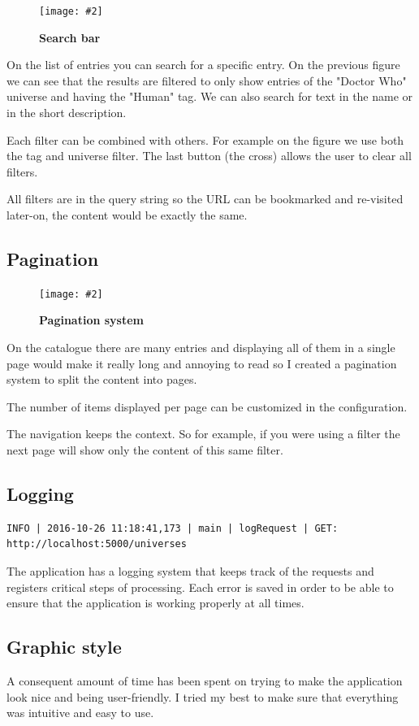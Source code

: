 \documentclass[10pt, a4paper]{article}
\newcommand{\figuremacro}[5]{
    \begin{figure}[#1]
        \centering
        \texttt{[image: \#2]}
        \caption[#3]{\textbf{#3}#4}
        \label{fig:#2}
    \end{figure}
}
\begin{document}
	\figuremacro{h}{SearchSystem}{Search bar}{}{0.6}
	
	On the list of entries you can search for a specific entry. On the previous figure we can see that the results are filtered to only show entries of the "Doctor Who" universe and having the "Human" tag. We can also search for text in the name or in the short description.
	
	Each filter can be combined with others. For example on the figure we use both the tag and universe filter. The last button (the cross) allows the user to clear all filters.
	
	All filters are in the query string so the URL can be bookmarked and re-visited later-on, the content would be exactly the same.
	
	\subsection{Pagination}
	
	\figuremacro{h}{Pagination}{Pagination system}{}{0.2}
	
	On the catalogue there are many entries and displaying all of them in a single page would make it really long and annoying to read so I created a pagination system to split the content into pages.
	
	The number of items displayed per page can be customized in the configuration.
	
	The navigation keeps the context. So for example, if you were using a filter the next page will show only the content of this same filter.
	
	\subsection{Logging}
	
	\begin{lstlisting}[caption = A line of the log file]
	INFO | 2016-10-26 11:18:41,173 | main | logRequest | GET: http://localhost:5000/universes\end{lstlisting}
	
	The application has a logging system that keeps track of the requests and registers critical steps of processing. Each error is saved in order to be able to ensure that the application is working properly at all times.
	
	\subsection{Graphic style}
	A consequent amount of time has been spent on trying to make the application look nice and being user-friendly. I tried my best to make sure that everything was intuitive and easy to use.
	
\end{document}
